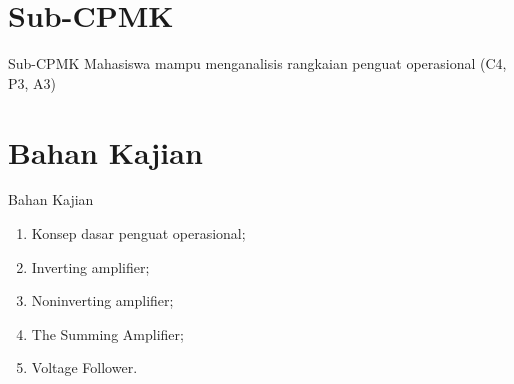 \section{Sub-CPMK}
\begin{frame}{Sub-CPMK}
	Mahasiswa mampu menganalisis rangkaian penguat operasional (C4, P3, A3)
\end{frame}

\section{Bahan Kajian}
\begin{frame}{Bahan Kajian}
	\begin{enumerate}
		\item Konsep dasar penguat operasional;
		\item Inverting amplifier;
		\item Noninverting amplifier;
		\item The Summing Amplifier;
		\item Voltage Follower.
	\end{enumerate}
\end{frame}